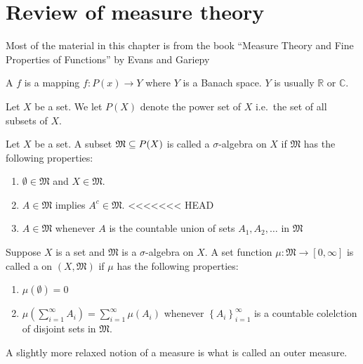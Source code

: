 \chapter{Review of measure theory}

Most of the material in this chapter is from the book ``Measure Theory
and Fine Properties of Functions'' by Evans and Gariepy
\cite{evans1991measure}

\begin{defn}
  A  $f$ is a mapping $f:P(x) \to Y$ where $Y$ is a
  Banach space. $Y$ is usually $\mathbb{R}$ or $\mathbb{C}$.
\end{defn}

\begin{defn}
  Let $X$ be a set. We let $P(X)$ denote the power set of $X$ i.e.\ the
  set of all subsets of $X$.
\end{defn}

\begin{defn}
  Let $X$ be a set. A subset $\mathfrak{M}\subseteq P(X)$ is called a
  $\sigma$-algebra on $X$ if $\mathfrak{M}$ has the following properties:
  \begin{enumerate}
    \item $\emptyset \in \mathfrak{M}$ and $X\in \mathfrak{M}$.
    \item $A\in \mathfrak{M}$ implies $A^c\in \mathfrak{M}$.
<<<<<<< HEAD
    \item $A\in \mathfrak{M}$ whenever $A$ is the countable union of
      sets $A_1,A_2,\ldots$ in $\mathfrak{M}$
  \end{enumerate}
\end{defn}

\begin{defn}
  Suppose $X$ is a set and $\mathfrak{M}$ is a $\sigma$-algebra on
  $X$. A set function $\mu: \mathfrak{M} \to [0,\infty]$ is called a
   on $(X, \mathfrak{M})$ if $\mu$ has the following
  properties:
  \begin{enumerate}
    \item $\mu(\emptyset)=0$
    \item $\mu\left( \sum_{i=1}^\infty A_i \right) =
      \sum_{i=1}^\infty\mu(A_i)$ whenever $\left\{ A_i
      \right\}_{i=1}^\infty$ is a countable colelction of disjoint sets
      in $ \mathfrak{M}$.
  \end{enumerate}
\end{defn}

A slightly more relaxed notion of a measure is what is called an outer measure.

